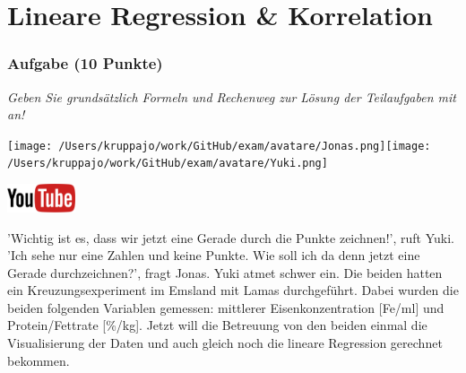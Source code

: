 \documentclass[a4paper, 9pt]{scrartcl}\usepackage[]{graphicx}\usepackage[]{xcolor}
\begin{document}
\vspace{1cm}
 




 
\clearpage
\part{Lineare Regression \& Korrelation}

\section{Aufgabe \hfill (10 Punkte)}

\textit{Geben Sie grundsätzlich Formeln und Rechenweg zur Lösung der Teilaufgaben mit an!} \\[1Ex]
 

 
\begin{minipage}[t]{0.5\textwidth}
\texttt{[image: /Users/kruppajo/work/GitHub/exam/avatare/Jonas.png]}\hspace{-4mm}\texttt{[image: /Users/kruppajo/work/GitHub/exam/avatare/Yuki.png]}
\end{minipage}
\begin{minipage}[t]{0.5\textwidth}
\hfill
\href{https://youtu.be/kHmfEmU6lrk}{\includegraphics[width = 2cm]{img/youtube}}
\end{minipage}
\vspace{1ex}



'Wichtig ist es, dass wir jetzt eine Gerade durch die Punkte zeichnen!', ruft Yuki. 'Ich sehe nur eine Zahlen und keine Punkte. Wie soll ich da denn jetzt eine Gerade durchzeichnen?', fragt Jonas. Yuki atmet schwer ein. Die beiden hatten ein Kreuzungsexperiment im Emsland mit Lamas durchgeführt. Dabei wurden die beiden folgenden Variablen gemessen: mittlerer Eisenkonzentration [Fe/ml] und Protein/Fettrate [\%/kg]. Jetzt will die Betreuung von den beiden einmal die Visualisierung der Daten und auch gleich noch die lineare Regression gerechnet bekommen.
\end{document}
